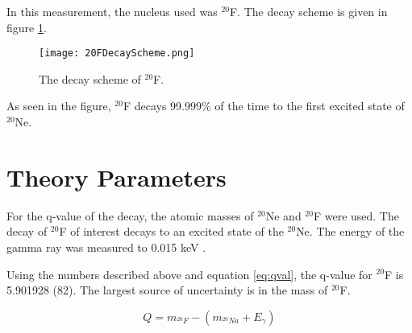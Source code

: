 In this measurement, the nucleus used was $^{20}$F.
The decay scheme is given in figure \ref{fig:DecayScheme}.

\begin{figure}[!htb]
	\centerline{\texttt{[image: 20FDecayScheme.png]}}
	\caption{The decay scheme of $^{20}$F.}
	\label{fig:DecayScheme}
\end{figure}

As seen in the figure, $^{20}$F decays 99.999\% of the time to the first excited state of $^{20}$Ne.
 

\section{Theory Parameters}

For the q-value of the decay, the atomic masses of $^{20}$Ne and $^{20}$F were used.
The decay of $^{20}$F of interest decays to an excited state of the $^{20}$Ne.
The energy of the gamma ray was measured to 0.015 keV \cite{Til98}.

Using the numbers described above and equation \ref{eq:qval}, the q-value for $^{20}$F is 5.901928 (82).
The largest source of uncertainty is in the mass of $^{20}$F.

\begin{equation}
	Q = m_{^{20}F} - (m_{^{20}Na} + E_{\gamma})
	\label{eq:qval}
\end{equation}
